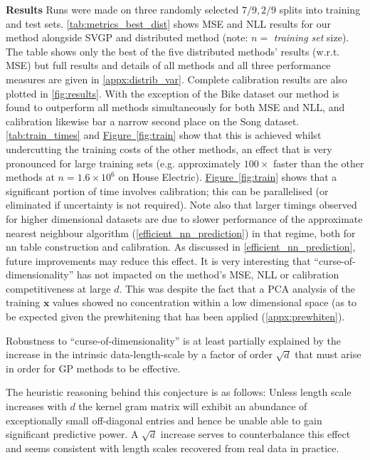\textbf{Results}
 Runs were made on three randomly selected $7/9,2/9$ splits into training and test sets. \autoref{tab:metrics_best_dist} shows MSE and NLL results for our method alongside SVGP and distributed method (note: $n=$ {\it training set} size). 
The table shows only the best of the five distributed methods' results (w.r.t. MSE) but full results and details of all methods and all three performance measures are given in \ref{appx:distrib_var}. Complete calibration results are also plotted in \autoref{fig:results}.
With the exception of the Bike dataset our method is found to outperform all methods simultaneously for both MSE and NLL, and calibration likewise bar a narrow second place on the Song dataset. \autoref{tab:train_times} and \hyperref[{fig:train}]{Figure~\ref*{fig:train}} show that this is achieved whilst undercutting the training costs of the other methods, an effect that is very pronounced for large training sets (e.g. approximately $100\times$ faster than the other methods at $n= 1.6 \times 10^6$ on House Electric). \hyperref[{fig:train}]{Figure~\ref*{fig:train}} shows that a significant portion of time involves calibration; this can be parallelised (or eliminated if uncertainty is not required). Note also that larger timings observed for higher dimensional datasets are due to slower performance of the approximate nearest neighbour algorithm (\ref{efficient_nn_prediction}) in that regime, both for nn table construction and calibration. As discussed in \ref{efficient_nn_prediction}, future improvements may reduce this effect. It is very interesting that ``curse-of-dimensionality'' has not impacted on the method's MSE, NLL or calibration competitiveness at large $d$. This was despite the fact that a PCA analysis of the training $\bm{x}$ values showed no concentration within a low dimensional space (as to be expected given the prewhitening that has been applied (\autoref{appx:prewhiten}).

\begin{conjecture} 
\label{conj:curse}
Robustness to ``curse-of-dimensionality'' is at least partially explained by the increase in the intrinsic data-length-scale by a factor of order $\sqrt{d}$ that must arise in order for GP methods to be effective.
\end{conjecture}
The heuristic reasoning behind this conjecture is as follows: Unless length scale increases with $d$ the kernel gram matrix will exhibit an abundance of exceptionally small off-diagonal entries and hence be unable able to gain significant predictive power. A $\sqrt{d}$ increase serves to counterbalance this effect and seems consistent with length scales recovered from real data in practice.

